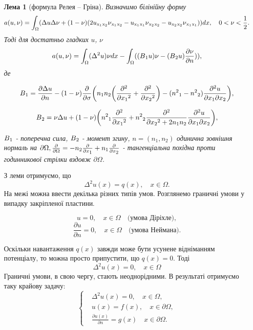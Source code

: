 \documentclass[12pt]{report}
\newtheorem{lema}{Лема}
\begin{document}
\begin{lema}[формула Релея – Гріна]
\label{lemaRG}
	Визначимо білінійну форму 
	$$
		a( u,\nu)=\int_{\Omega}(\Delta u\Delta\nu+(1-\nu)(2 u\textsubscript{x\textsubscript{1}}		\textsubscript{x\textsubscript{2}}\nu\textsubscript{x\textsubscript{1}}\textsubscript{x\textsubscript{2}}-	 u\textsubscript{x\textsubscript{1}}\textsubscript{x\textsubscript{1}}\nu\textsubscript{x\textsubscript{2}}	\textsubscript{x\textsubscript{2}}- u\textsubscript{x\textsubscript{2}}\textsubscript{x\textsubscript{2}}	\nu\textsubscript{x\textsubscript{1}}\textsubscript{x\textsubscript{1}}))dx, \quad 0<\nu<\frac{1}{2}.
	$$
	Тоді для достатньо гладких $u$, $\nu$
	$$
		a( u,\nu)=\int_{\Omega}(\Delta^2 u)\nu dx-\int_{\Omega}((B\textsubscript{1} u)\nu-	(B\textsubscript{2} u)\frac{\partial\nu}{\partial n})), 
	$$
	де

$$
	B\textsubscript{1}=\frac{\partial\Delta u}{\partial n}-(1-\nu)\frac{\partial}{\partial\sigma}\bigg(n\textsubscript{1}n\textsubscript{2}\bigg(\frac{\partial^{2}}{\partial x\textsubscript{1}^2}+\frac{\partial^{2}}{\partial x\textsubscript{2}^2}\bigg)-(n^2\textsubscript{1}-n^2\textsubscript{2})\frac{\partial^{2} u}{\partial x\textsubscript{1}\partial x\textsubscript{2}}\bigg),
$$

$$
	B\textsubscript{2}=\nu\Delta u+(1-\nu)\bigg(n^2\textsubscript{1}\frac{\partial^{2}}{\partial x\textsubscript{1}^2}+n^2\textsubscript{2}\frac{\partial^{2}}{\partial x\textsubscript{2}^2+2n\textsubscript{1}n\textsubscript{2}}\frac{\partial^{2} u}{\partial x\textsubscript{1}\partial x\textsubscript{2}}\bigg),
$$

\noindent$B\textsubscript{1}$ - поперечна сила, $B\textsubscript{2}$ - момент згину, $n=(n_1, n_2)$ одинична зовнішня нормаль на $\partial\Omega, \frac{\partial}{\partial\Omega}=-n\textsubscript{2}\frac{\partial}{\partial x\textsubscript{1}}+n\textsubscript{1}\frac{\partial}{\partial x\textsubscript{2}}$ - тангенціальна похідна проти годинникової стрілки вздовж $\partial\Omega$.
\end{lema}

З леми отримуємо, що 
$$
	\Delta^2 u(x)=q(x), \quad x\in\Omega.
$$
На межі можна ввести декілька різних типів умов. Розглянемо граничні умови у випадку закріпленої пластини.

$$
	 u=0, \quad x\in\Omega \quad \textrm{(умова Діріхле)},
$$
$$
	\frac{\partial u}{\partial n}=0, \quad x\in\Omega \quad \textrm{(умова Неймана)}.
$$

Оскільки навантаження $q(x)$ завжди може бути усунене відніманням потенціалу, то можна просто припустити, що $q(x)=0$. Тоді
$$
	\Delta^2 u(x)=0, \quad  x\in\Omega
$$
Граничні умови, в свою чергу, стають неоднорідними. В результаті отримуємо таку крайову задачу:
\begin{equation}
	\label{mainSys}
	\left\{
	\begin{split}
		&\Delta^2 u(x)=0, \quad x\in\Omega, \\
		&u(x)=f(x), \quad x\in\partial\Omega, \\
		&\frac{\partial u(x)}{\partial n}=g(x) \quad x\in\partial\Omega.
	\end{split}
	\right.
\end{equation}
\end{document}
